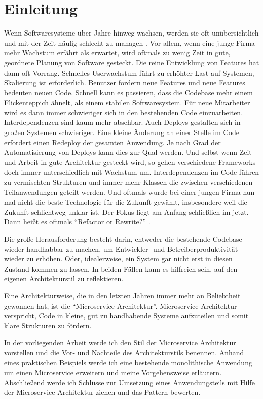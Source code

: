 \chapter{Einleitung}
Wenn Softwaresysteme über Jahre hinweg wachsen, werden sie oft unübersichtlich und mit der Zeit häufig schlecht zu managen \cite{infaktuell}. Vor allem, wenn eine junge Firma mehr Wachstum erfährt als erwartet, wird oftmals zu wenig Zeit in gute, geordnete Planung von Software gesteckt. Die reine Entwicklung von Features hat dann oft Vorrang. Schnelles Userwachstum führt zu erhöhter Last auf Systemen, Skalierung ist erforderlich. Benutzer fordern neue Features und neue Features bedeuten neuen Code. Schnell kann es passieren, dass die Codebase mehr einem Flickenteppich ähnelt, als einem stabilen Softwaresystem. Für neue Mitarbeiter wird es dann immer schwieriger sich in den bestehenden Code einzuarbeiten. Interdependenzen sind kaum mehr absehbar. Auch Deploys gestalten sich in großen Systemen schwieriger. Eine kleine Änderung an einer Stelle im Code erfordert einen Redeploy der gesamten Anwendung. Je nach Grad der Automatisierung von Deploys kann dies zur Qual werden. Und selbst wenn Zeit und Arbeit in gute Architektur gesteckt wird, so gehen verschiedene Frameworks doch immer unterschiedlich mit Wachstum um. Interdependenzen im Code führen zu vermischten Strukturen und immer mehr Klassen die zwischen verschiedenen Teilanwendungen geteilt werden. Und oftmals wurde bei einer jungen Firma nun mal nicht die beste Technologie für die Zukunft gewählt, insbesondere weil die Zukunft schlichtweg unklar ist. Der Fokus liegt am Anfang schließlich im jetzt. Dann heißt es oftmals ``Refactor or Rewrite?'' \cite[vgl.][]{refactorrewrite}.

Die große Herausforderung besteht darin, entweder die bestehende Codebase wieder handhabbar zu machen, um Entwickler- und Betreiberproduktivität wieder zu erhöhen. Oder, idealerweise, ein System gar nicht erst in diesen Zustand kommen zu lassen. In beiden Fällen kann es hilfreich sein, auf den eigenen Architekturstil zu reflektieren.

Eine Architekturweise, die in den letzten Jahren immer mehr an Beliebtheit gewonnen hat, ist die ``Microservice Architektur''. Microservice Architektur verspricht, Code in kleine, gut zu handhabende Systeme aufzuteilen und somit klare Strukturen zu fördern.

In der vorliegenden Arbeit werde ich den Stil der Microservice Architektur vorstellen und die Vor- und Nachteile des Architekturstils benennen. Anhand eines praktischen Beispiels werde ich eine bestehende monolithische Anwendung um einen Microservice erweitern und meine Vorgehensweise erläutern.
Abschließend werde ich Schlüsse zur Umsetzung eines Anwendungsteils mit Hilfe der Microservice Architektur ziehen und das Pattern bewerten.
